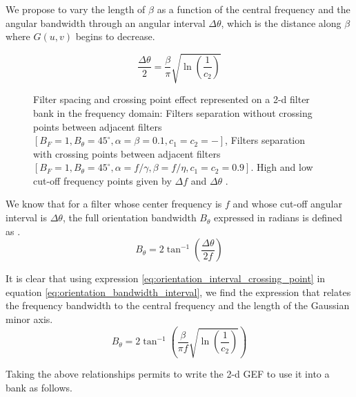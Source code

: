 We propose to vary the length of $\beta$ as a function of the central frequency and the angular bandwidth through an angular interval $\Delta \theta$, which is the distance along $\beta$ where $G(u, v)$ begins to decrease.

\begin{equation}\label{eq:orientation_interval_crossing_point}
    \frac{\Delta \theta}{2} = \frac{\beta}{\pi}\sqrt{\ln \left(\frac{1}{c_2}\right)}
\end{equation}

\begin{figure}[!ht]
\centering
\caption{Filter spacing and crossing point effect represented on a 2-d filter bank in the frequency domain:  Filters separation without crossing points between adjacent filters $[B_F=1, B_{\theta} = 45^{\circ}, \alpha=\beta=0.1, c_1=c_2=-]$,  Filters separation with crossing points between adjacent filters $[B_F=1, B_{\theta} = 45^{\circ}, \alpha=f/\gamma, \beta=f/\eta, c_1=c_2=0.9]$. High and low cut-off frequency points given by $\Delta f$ and $\Delta \theta$ .}\label{fig:2d_filterbank_spacing}
\end{figure}

We know that for a filter whose center frequency is $f$ and whose cut-off angular interval is $\Delta \theta$, the full orientation bandwidth $B_\theta$ expressed in radians is defined as \citep{Daugman:JOSA:1985}.
\begin{equation}\label{eq:orientation_bandwidth_interval}
    B_{\theta} = 2 \tan^{-1} \left( \frac{\Delta \theta}{2f} \right)
\end{equation}

It is clear that using expression \eqref{eq:orientation_interval_crossing_point} in equation \eqref{eq:orientation_bandwidth_interval}, we find the expression that relates the frequency bandwidth to the central frequency and the length of the Gaussian minor axis.
\begin{equation}\label{eq:orientation_bandwidth}
    B_{\theta} = 2 \tan^{-1} \left( \frac{\beta}{\pi f} \sqrt{\ln \left(\frac{1}{c_2}\right)} \right)
\end{equation}

Taking the above relationships permits to write the 2-d GEF to use it into a bank as follows. 

